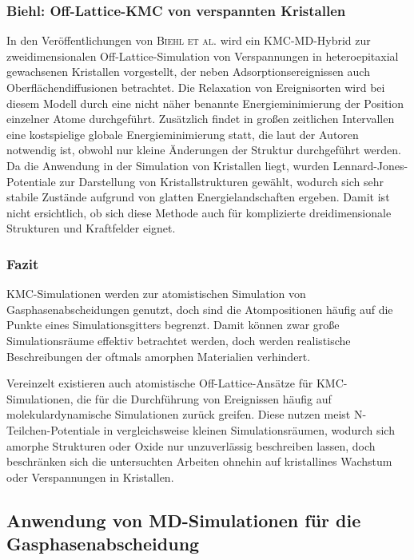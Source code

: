 \subsubsection{Biehl: Off-Lattice-KMC von verspannten Kristallen}

In den Veröffentlichungen von \textsc{Biehl et al.}\cite{biehl_off-lattice_2005} wird ein KMC-MD-Hybrid zur zweidimensionalen Off-Lattice-Simulation von Verspannungen in heteroepitaxial gewachsenen Kristallen vorgestellt, der neben Adsorptionsereignissen auch Oberflächendiffusionen betrachtet.
Die Relaxation von Ereignisorten wird bei diesem Modell durch eine nicht näher benannte Energieminimierung der Position einzelner Atome durchgeführt.
Zusätzlich findet in großen zeitlichen Intervallen eine kostspielige globale Energieminimierung statt, die laut der Autoren notwendig ist, obwohl nur kleine Änderungen der Struktur durchgeführt werden.
Da die Anwendung in der Simulation von Kristallen liegt, wurden Lennard-Jones-Potentiale zur Darstellung von Kristallstrukturen gewählt, wodurch sich sehr stabile Zustände aufgrund von glatten Energielandschaften ergeben.
Damit ist nicht ersichtlich, ob sich diese Methode auch für komplizierte dreidimensionale Strukturen und Kraftfelder eignet.

\subsubsection{Fazit}

KMC-Simulationen werden zur atomistischen Simulation von Gasphasenabscheidungen genutzt, doch sind die Atompositionen häufig auf die Punkte eines Simulationsgitters begrenzt.
Damit können zwar große Simulationsräume effektiv betrachtet werden, doch werden realistische Beschreibungen der oftmals amorphen Materialien verhindert.

Vereinzelt existieren auch atomistische Off-Lattice-Ansätze für KMC-Simulationen, die für die Durchführung von Ereignissen häufig auf molekulardynamische Simulationen zurück greifen.
Diese nutzen meist N-Teilchen-Potentiale in vergleichsweise kleinen Simulationsräumen, wodurch sich amorphe Strukturen oder Oxide nur unzuverlässig beschreiben lassen, doch beschränken sich die untersuchten Arbeiten ohnehin auf kristallines Wachstum oder Verspannungen in Kristallen.

\subsection{Anwendung von MD-Simulationen für die Gasphasenabscheidung}

